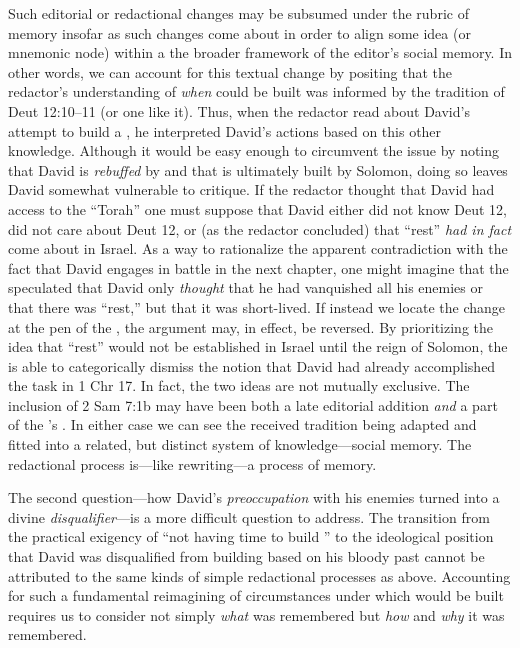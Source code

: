 Such editorial or redactional changes may be subsumed under the rubric of memory insofar as such changes come about in order to align some idea (or mnemonic node) within a the broader framework of the editor's social memory. In other words, we can account for this textual change by positing that the redactor's understanding of \emph{when} \thetemple could be built was informed by the tradition of Deut 12:10--11 (or one like it). Thus, when the redactor read about David's attempt to build a \temple, he interpreted David's actions based on this other knowledge. Although it would be easy enough to circumvent the issue by noting that David is \emph{rebuffed} by \yahweh and that \thetemple is ultimately built by Solomon, doing so leaves David somewhat vulnerable to critique. If the redactor thought that David had access to the ``Torah'' one must suppose that David either did not know Deut 12, did not care about Deut 12, or (as the redactor concluded) that ``rest'' \emph{had in fact} come about in Israel. As a way to rationalize the apparent contradiction with the fact that David engages in battle in the next chapter, one might imagine that the \chronicler speculated that David only \emph{thought} that he had vanquished all his enemies or that there was ``rest,'' but that it was short-lived. If instead we locate the change at the pen of the \chronicler, the argument may, in effect, be reversed. By prioritizing the idea that ``rest'' would not be established in Israel until the reign of Solomon, the \chronicler is able to categorically dismiss the notion that David had already accomplished the task in 1 Chr 17. In fact, the two ideas are not mutually exclusive. The inclusion of 2 Sam 7:1b may have been both a late editorial addition \emph{and} a part of the \chronicler's \vorlage. In either case we can see the received tradition being adapted and fitted into a related, but distinct system of knowledge---social memory. The redactional process is---like rewriting---a process of memory.

The second question---how David's \emph{preoccupation} with his enemies turned into a divine \emph{disqualifier}---is a more difficult question to address. The transition from the practical exigency of ``not having time to build \thetemple'' to the ideological position that David was disqualified from building \thetemple based on his bloody past cannot be attributed to the same kinds of simple redactional processes as above. Accounting for such a fundamental reimagining of circumstances under which \thetemple would be built requires us to consider not simply \emph{what} was remembered but \emph{how} and \emph{why} it was remembered. 


